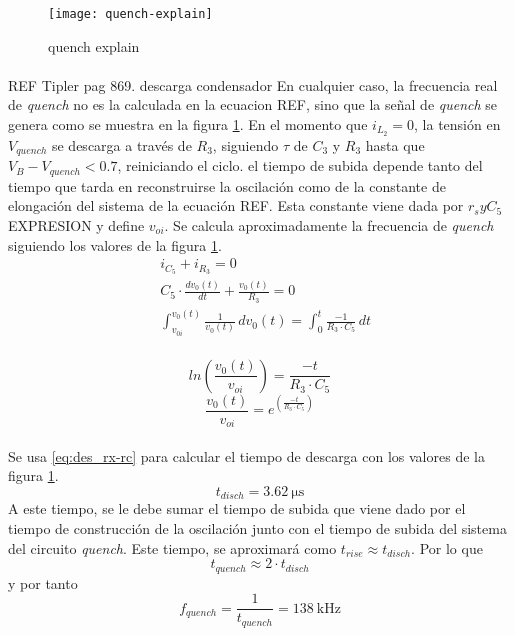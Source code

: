 \begin{figure}[h!]
    \centering
    \texttt{[image: quench-explain]}
    \caption{quench explain}
    \label{fig:quench-explain}
\end{figure}

\paragraph{}
REF Tipler pag 869. descarga condensador
En cualquier caso, la frecuencia real de \textit{quench} no es la calculada en la ecuacion REF, sino que la señal de \textit{quench} se genera como se muestra en la figura \ref{fig:quench-explain}. 
En el momento que $i_{L_2} = 0$, la tensión en $V_{quench}$ se descarga a trav\'es de $R_3$, siguiendo $\tau$ de $C_3$ y $R_3$ hasta que $V_B - V_{quench} < 0.7$, reiniciando el ciclo.
el tiempo de subida depende tanto del tiempo que tarda en reconstruirse la oscilaci\'on como de la constante de elongación del sistema de la ecuación REF. Esta constante viene dada por $r_s y C_5$ EXPRESION y define $v_{oi}$.
Se calcula aproximadamente la frecuencia de \textit{quench} siguiendo los valores de la figura \ref{fig:quench-explain}. 
\begin{align*} 
   &i_{C_5} + i_{R_3} = 0 \\
   &C_5 \cdot \frac{dv_0(t)}{dt} + \frac{v_0(t)}{R_3} = 0 \\
   &\int_{v_{0i}}^{v_0(t)} \frac{1}{v_0(t)} \, dv_0(t) = \int_{0}^{t} \frac{-1}{R_3 \cdot C_5} \, dt \\
\end{align*}

\begin{equation}
   \label{eq:des_rx-rc}
   ln \left( \frac{v_0(t)}{v_{oi}} \right) = \frac{-t}{R_3 \cdot C_5}
\end{equation}
\begin{equation}
   \frac{v_0(t)}{v_{oi}} = e^{\left( \frac{-t}{R_3 \cdot C_5} \right)}
\end{equation}

\paragraph{}
Se usa \ref{eq:des_rx-rc} para calcular el tiempo de descarga con los valores de la figura \ref{fig:quench-explain}.
$$ t_{disch} = \SI{3.62}{\micro\second} $$
A este tiempo, se le debe sumar el tiempo de subida que viene dado por el tiempo de construcción de la oscilación junto con el tiempo de subida del sistema del circuito \textit{quench}.
Este tiempo, se aproximar\'a como $t_{rise} \approx t_{disch}$. Por lo que $$t_{quench} \approx 2 \cdot t_{disch}$$ y por tanto $$f_{quench} = \frac{1}{t_{quench}}  = \SI{138}{\kilo\hertz} $$
